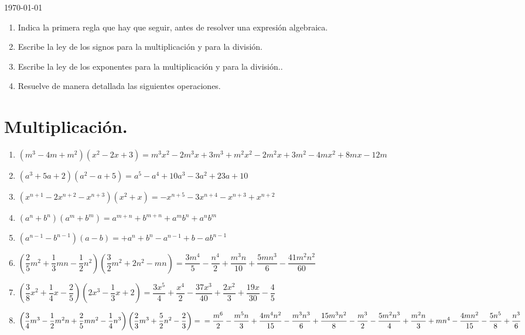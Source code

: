 \documentclass[12pt]{article}
\begin{document}
\begin{center}
\today
\end{center}

\begin{enumerate}
\item Indica la primera regla que hay que seguir, antes de resolver una expresión algebraica.
\item Escribe la ley de los signos para la multiplicación y para la división.
\item Escribe la ley de los exponentes para la multiplicación y para la división..
\item Resuelve de manera detallada las siguientes operaciones.
\end{enumerate}

\section{Multiplicación.}

\begin{enumerate}
\item $(m^{3} - 4 m + m^{2})(x^{2} - 2 x + 3) = m^3 x^2-2 m^3 x+3 m^3+m^2 x^2-2 m^2 x+3 m^2-4 m x^2+8 m x-12 m$ 
\item $(a^{3} +5 a+ 2)(a^{2} - a + 5) = a^5-a^4+10 a^3-3 a^2+23 a+10$
\item $(x^{n+1} - 2 x^{n+2} - x^{n+3})(x^{2} + x) = -x^{n+5} - 3 x^{n+4} - x^{n+3} + x^{n+2}$
\item $(a^{n} + b^{n})(a^{m} + b^{m}) = a^{m+n} + b^{m+n} + a^m b^n + a^n b^m$
\item $(a^{n-1} - b^{n-1})(a - b) = +a^n + b^n - a^{n-1} +b - a b^{n-1}$
\item $\left( \dfrac{2}{5} m^{2} + \dfrac{1}{3} m n - \dfrac{1}{2} n^{2} \right) \left( \dfrac{3}{2} m^{2} + 2 n^{2} - m n \right) = \dfrac{3 m^4}{5} - \dfrac{n^4}{2} + \dfrac{m^3 n}{10} + \dfrac{5 m n^3}{6} - \dfrac{41 m^2 n^2}{60}$
\item $\left( \dfrac{3}{8} x^{2} + \dfrac{1}{4} x - \dfrac{2}{5} \right) \left( 2 x^{3} - \dfrac{1}{3} x + 2 \right) = \dfrac{3 x^5}{4} + \dfrac{x^4}{2} - \dfrac{37 x^3}{40} + \dfrac{2 x^2}{3} + \dfrac{19 x}{30} - \dfrac{4}{5}$
\item $\left( \dfrac{3}{4} m^{3} - \dfrac{1}{2} m^{2} n + \dfrac{2}{5} m n^{2} - \dfrac{1}{4} n^{3} \right) \left( \dfrac{2}{3} m^{3} + \dfrac{5}{2} n^{2} - \dfrac{2}{3}\right) = \\
=\dfrac{m^6}{2} - \dfrac{m^5 n}{3} + \dfrac{4 m^4 n^2}{15} - \dfrac{m^3 n^3}{6} + \dfrac{15 m^3 n^2}{8} - \dfrac{m^3}{2} - \dfrac{5 m^2 n^3}{4} + \dfrac{m^2 n}{3} + m n^4-\dfrac{4 m n^2}{15} - \dfrac{5 n^5}{8} + \dfrac{n^3}{6}$
\end{enumerate}
\end{document}
